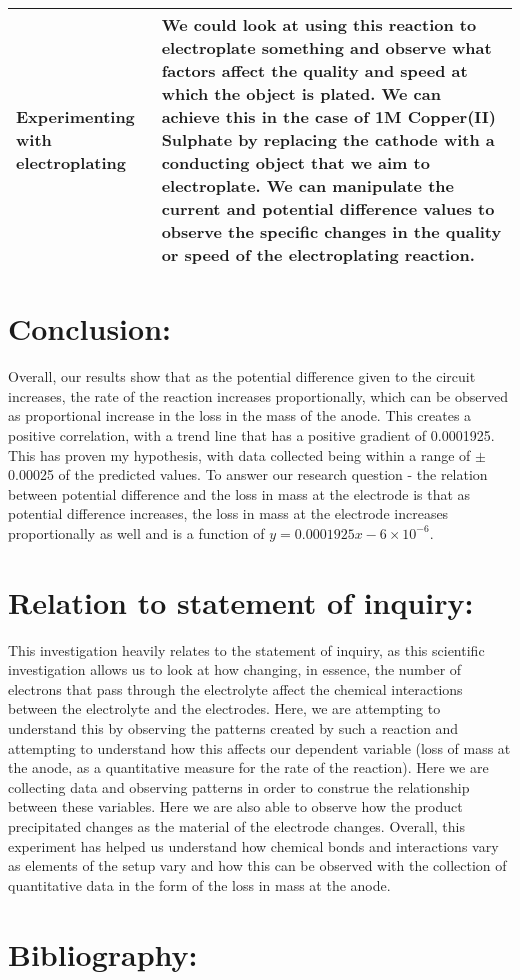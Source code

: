 \documentclass[11pt, a4]{article}
\begin{document}
\begin{small}
\begin{longtable}{|>{\centering\arraybackslash}m{5.2cm}|>{\centering\arraybackslash}m{10cm}|}
					\hline
					Experimenting with electroplating &
					We could look at using this reaction to electroplate something and observe what factors affect the quality and speed at which the object is plated. We can achieve this in the case of 1M Copper(II) Sulphate by replacing the cathode with a conducting object that we aim to electroplate. We can manipulate the current and potential difference values to observe the specific changes in the quality or speed of the electroplating reaction.\\
					\hline
				\end{longtable}
			\end{small}
	\section{Conclusion:}
		Overall, our results show that as the potential difference given to the circuit increases, the rate of the reaction increases proportionally, which can be observed as proportional increase in the loss in the mass of the anode. This creates a positive correlation, with a trend line that has a positive gradient of 0.0001925. This has proven my hypothesis, with data collected being within a range of $\pm$ 0.00025 of the predicted values. To answer our research question - the relation between potential difference and the loss in mass at the electrode is that as potential difference increases, the loss in mass at the electrode increases proportionally as well and is a function of $y = 0.0001925x - 6\times 10^{-6}$.
	
	\section{Relation to statement of inquiry:}
		This investigation heavily relates to the statement of inquiry, as this scientific investigation allows us to look at how changing, in essence, the number of electrons that pass through the electrolyte affect the chemical interactions between the electrolyte and the electrodes. Here, we are attempting to understand this by observing the patterns created by such a reaction and attempting to understand how this affects our dependent variable (loss of mass at the anode, as a quantitative measure for the rate of the reaction). Here we are collecting data and observing patterns in order to construe the relationship between these variables. Here we are also able to observe how the product precipitated changes as the material of the electrode changes. Overall, this experiment has helped us understand how chemical bonds and interactions vary as elements of the setup vary and how this can be observed with the collection of quantitative data in the form of the loss in mass at the anode.

	\newpage
	\section{Bibliography:}
		\begin{center}
		\end{center} 
	
	
\end{document}

